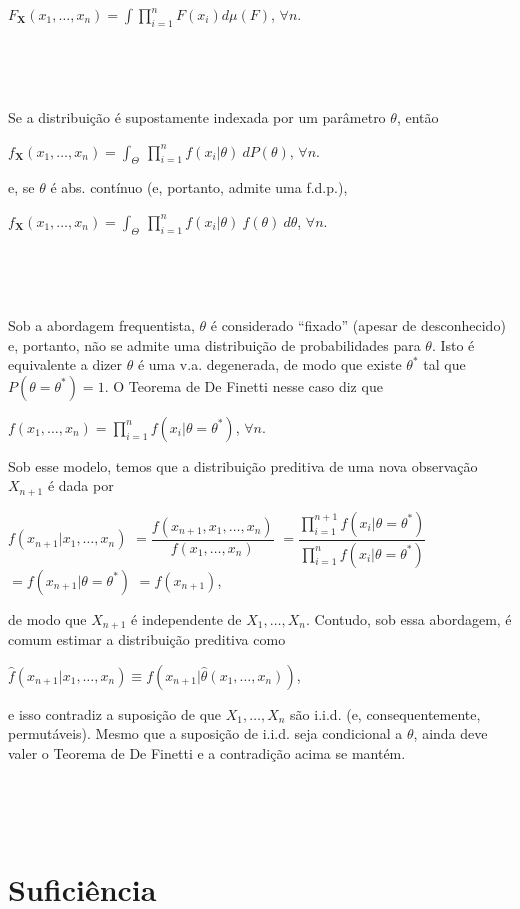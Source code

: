 \documentclass[
]{book}
\begin{document}
\(F_{\mathbf X}(x_1,\ldots,x_n)=\displaystyle\int\prod_{i=1}^n F(x_i)d\mu(F)\), \(\forall n\).

\(~\)

\(~\)

Se a distribuição é supostamente indexada por um parâmetro \(\theta\), então

\(f_{\mathbf X}(x_1,\ldots,x_n)=\displaystyle\int_{\Theta}~\prod_{i=1}^n f(x_i|\theta)~dP(\theta)\), \(\forall n\).

e, se \(\theta\) é abs. contínuo (e, portanto, admite uma f.d.p.),

\(f_{\mathbf X}(x_1,\ldots,x_n)=\displaystyle\int_\Theta~\prod_{i=1}^n f(x_i|\theta)~f(\theta)~d\theta\), \(\forall n\).

\(~\)

\(~\)

Sob a abordagem frequentista, \(\theta\) é considerado ``fixado'' (apesar de desconhecido) e, portanto, não se admite uma distribuição de probabilidades para \(\theta\). Isto é equivalente a dizer \(\theta\) é uma v.a. degenerada, de modo que existe \(\theta^*\) tal que \(P(\theta=\theta^*)=1\). O Teorema de De Finetti nesse caso diz que

\(f(x_1,\ldots,x_n) = \displaystyle\prod_{i=1}^n f(x_i|\theta=\theta^*)\), \(\forall n\).

Sob esse modelo, temos que a distribuição preditiva de uma nova observação \(X_{n+1}\) é dada por

\(f(x_{n+1}|x_1,\ldots,x_n)\) \(= \dfrac{f(x_{n+1},x_1,\ldots,x_n)}{f(x_1,\ldots,x_n)}\) \(=\dfrac{\displaystyle\prod_{i=1}^{n+1} f(x_i|\theta=\theta^*)}{\displaystyle\prod_{i=1}^{n} f(x_i|\theta=\theta^*)}\) \(= f(x_{n+1}|\theta=\theta^*)\) \(=f(x_{n+1})\),

de modo que \(X_{n+1}\) é independente de \(X_{1},\ldots,X_{n}\). Contudo, sob essa abordagem, é comum estimar a distribuição preditiva como

\(\hat{f}(x_{n+1}|x_1,\ldots,x_n) \equiv f\left(x_{n+1}|\hat{\theta}\left(x_1,\ldots,x_n\right)\right)\),

e isso contradiz a suposição de que \(X_1,\ldots,X_n\) são i.i.d. (e, consequentemente, permutáveis). Mesmo que a suposição de i.i.d. seja condicional a \(\theta\), ainda deve valer o Teorema de De Finetti e a contradição acima se mantém.

\(~\)

\(~\)

\hypertarget{suficiuxeancia}{%
\section{Suficiência}\label{suficiuxeancia}}
\end{document}
